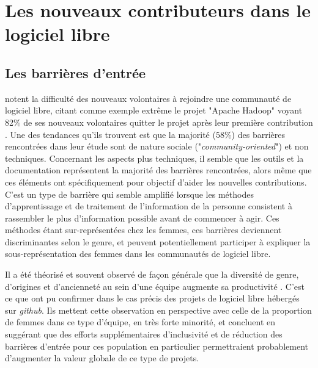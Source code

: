 \documentclass[dvipsnames]{llncs}
\newcommand{\en}[1]{\foreignlanguage{english}{\emph{#1}}}
\begin{document}
    \section{Les nouveaux contributeurs dans le logiciel libre}

    \subsection{Les barrières d'entrée}

    \textcite{barriers-2018} notent la difficulté des nouveaux volontaires à rejoindre une communauté de
    logiciel libre, citant comme exemple extrême le projet "Apache Hadoop" voyant 82\% de ses nouveaux
    volontaires quitter le projet après leur première contribution \parencite{hadoop-dropout-2013}. Une des
    tendances qu'ils trouvent est que la majorité ($58\%$) des barrières rencontrées dans leur étude sont de
    nature sociale ("\en{community-oriented}") et non techniques\parencite[p.~1008]{barriers-2018}. Concernant
    les aspects plus techniques, il semble que les outils et la documentation représentent la majorité des
    barrières rencontrées, alors même que ces éléments ont spécifiquement pour objectif d'aider les nouvelles
    contributions. C'est un type de barrière qui semble amplifié lorsque les méthodes d'apprentissage et de
    traitement de l'information de la personne consistent à rassembler le plus d'information possible avant de
    commencer à agir. Ces méthodes étant sur-représentées chez les
    femmes\parencite{gender-information-processing-1995,gender-information-processing-2015}, ces barrières
    deviennent discriminantes selon le genre, et peuvent potentiellement participer à expliquer la
    sous-représentation des femmes dans les communautés de logiciel libre.

    Il a été théorisé et souvent observé de façon générale que la diversité de genre, d'origines et
    d'ancienneté au sein d'une équipe augmente sa productivité \parencite[voir par exemple][]{diversity-2007}.
    C'est ce que \textcite{diversity-2015} ont pu confirmer dans le cas précis des projets de logiciel libre
    hébergés sur \en{github}. Ils mettent cette observation en perspective avec celle de la proportion de
    femmes dans ce type d'équipe, en très forte minorité, et concluent en suggérant que des efforts
    supplémentaires d'inclusivité et de réduction des barrières d'entrée pour ces population en particulier
    permettraient probablement d'augmenter la valeur globale de ce type de projets.
\end{document}
